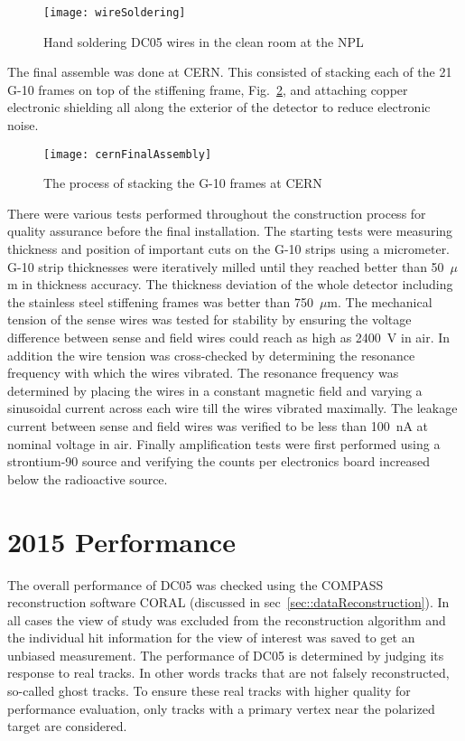\begin{figure}[h!t]
  \centering \texttt{[image: wireSoldering]}
  \caption{Hand soldering DC05 wires in the clean room at the NPL}
  \label{fig::wireSoldering}
\end{figure}

The final assemble was done at CERN.  This consisted of stacking each of the 21
G-10 frames on top of the stiffening frame, Fig.~\ref{fig::cernFinalAssembly},
and attaching copper electronic shielding all along the exterior of the detector
to reduce electronic noise.

\begin{figure}[h!t]
  \centering \texttt{[image: cernFinalAssembly]}
  \caption{The process of stacking the G-10 frames at CERN}
  \label{fig::cernFinalAssembly}
\end{figure}

There were various tests performed throughout the construction process for
quality assurance before the final installation.  The starting tests were
measuring thickness and position of important cuts on the G-10 strips using a
micrometer.  G-10 strip thicknesses were iteratively milled until they reached
better than 50~$\mu$m in thickness accuracy.  The thickness deviation of the
whole detector including the stainless steel stiffening frames was better than
750~$\mu$m.  The mechanical tension of the sense wires was tested for stability
by ensuring the voltage difference between sense and field wires could reach as
high as 2400~V in air.  In addition the wire tension was cross-checked by
determining the resonance frequency with which the wires vibrated.  The
resonance frequency was determined by placing the wires in a constant magnetic
field and varying a sinusoidal current across each wire till the wires vibrated
maximally.  The leakage current between sense and field wires was verified to be
less than 100~nA at nominal voltage in air.  Finally amplification tests were
first performed using a strontium-90 source and verifying the counts per
electronics board increased below the radioactive source.


\section{2015 Performance}

The overall performance of DC05 was checked using the COMPASS reconstruction
software CORAL (discussed in sec~\ref{sec::dataReconstruction}).  In all cases
the view of study was excluded from the reconstruction algorithm and the
individual hit information for the view of interest was saved to get an unbiased
measurement.  The performance of DC05 is determined by judging its response to
real tracks.  In other words tracks that are not falsely reconstructed,
so-called ghost tracks.  To ensure these real tracks with higher quality for
performance evaluation, only tracks with a primary vertex near the polarized
target are considered.

